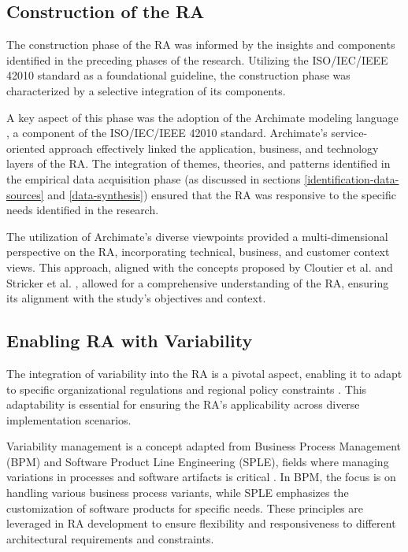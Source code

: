 \documentclass[review]{elsarticle}
\begin{document}
\subsection{Construction of the RA}

The construction phase of the RA was informed by the insights and components identified in the preceding phases of the research. Utilizing the ISO/IEC/IEEE 42010 standard \cite{ISO42010} as a foundational guideline, the construction phase was characterized by a selective integration of its components.

A key aspect of this phase was the adoption of the Archimate modeling language \cite{lankhorst2013language}, a component of the ISO/IEC/IEEE 42010 standard. Archimate's service-oriented approach effectively linked the application, business, and technology layers of the RA. The integration of themes, theories, and patterns identified in the empirical data acquisition phase (as discussed in sections \ref{identification-data-sources} and \ref{data-synthesis}) ensured that the RA was responsive to the specific needs identified in the research.

The utilization of Archimate's diverse viewpoints provided a multi-dimensional perspective on the RA, incorporating technical, business, and customer context views. This approach, aligned with the concepts proposed by Cloutier et al. \cite{Cloutier} and Stricker et al. \cite{Stricker}, allowed for a comprehensive understanding of the RA, ensuring its alignment with the study's objectives and context.




\subsection{Enabling RA with Variability}

The integration of variability into the RA is a pivotal aspect, enabling it to adapt to specific organizational regulations and regional policy constraints \cite{rurua2019representing}. This adaptability is essential for ensuring the RA's applicability across diverse implementation scenarios.

Variability management is a concept adapted from Business Process Management (BPM) and Software Product Line Engineering (SPLE), fields where managing variations in processes and software artifacts is critical \cite{la2009questionnaire, rosemann2007configurable, hallerbach2010capturing, pohl2005software, chen2011systematic, schmid2004customizable, svahnberg2005taxonomy, sinnema2006covamof}. In BPM, the focus is on handling various business process variants, while SPLE emphasizes the customization of software products for specific needs. These principles are leveraged in RA development to ensure flexibility and responsiveness to different architectural requirements and constraints.
\end{document}
